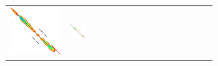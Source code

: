 \begin{figure}[H]
\begin{tabular}{l>{\centering}m{0.12\linewidth}>{\centering}m{0.12\linewidth}>{\centering}m{0.12\linewidth}>{\centering\arraybackslash}m{0.35\linewidth}}
    \includegraphics[scale=0.09]{imgs/comparison/csh.png} &
    \includegraphics[scale=0.09]{imgs/comparison/csh-noprune-dt.png} &

\end{tabular}
\end{figure}
